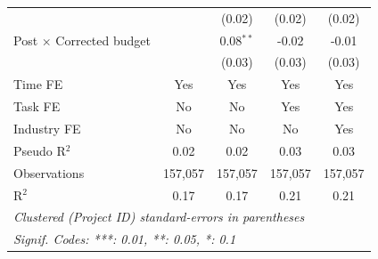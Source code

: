 \documentclass[
]{article}
\begin{document}
\begin{table}[htbp]
\begin{tabular}{lcccc}
                                        &               & (0.02)        & (0.02)        & (0.02)\\   
      Post $\times$ Corrected budget    &               & 0.08$^{**}$   & -0.02         & -0.01\\   
                                        &               & (0.03)        & (0.03)        & (0.03)\\   
      Time FE                           & Yes           & Yes           & Yes           & Yes\\  
      Task FE                           & No            & No            & Yes           & Yes\\  
      Industry FE                       & No            & No            & No            & Yes\\  
      Pseudo R$^2$                      & 0.02          & 0.02          & 0.03          & 0.03\\  
      Observations                      & 157,057       & 157,057       & 157,057       & 157,057\\  
      R$^2$                             & 0.17          & 0.17          & 0.21          & 0.21\\  
      \midrule
      \multicolumn{5}{l}{\emph{Clustered (Project ID) standard-errors in parentheses}}\\
      \multicolumn{5}{l}{\emph{Signif. Codes: ***: 0.01, **: 0.05, *: 0.1}}\\
   \end{tabular}
\end{table}
\end{document}

